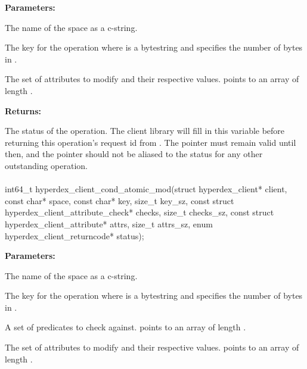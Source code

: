 \noindent\textbf{Parameters:}
\begin{description}[labelindent=\widthof{{\code{attrs}, \code{attrs\_sz}}},leftmargin=*,noitemsep,nolistsep,align=right]
\item[\code{space}] The name of the space as a c-string.
\item[\code{key}, \code{key\_sz}] The key for the operation where  is a bytestring and  specifies the number of bytes in .
\item[\code{attrs}, \code{attrs\_sz}] The set of attributes to modify and their respective values.   points to an array of length .
\end{description}

\noindent\textbf{Returns:}
\begin{description}[labelindent=\widthof{{\code{status}}},leftmargin=*,noitemsep,nolistsep,align=right]
\item[\code{status}] The status of the operation.  The client library will fill in this variable before returning this operation's request id from .  The pointer must remain valid until then, and the pointer should not be aliased to the status for any other outstanding operation.
\end{description}

\paragraph{}
\label{api:c:cond_atomic_mod}
\begin{ccode}
int64_t hyperdex_client_cond_atomic_mod(struct hyperdex_client* client,
        const char* space,
        const char* key, size_t key_sz,
        const struct hyperdex_client_attribute_check* checks, size_t checks_sz,
        const struct hyperdex_client_attribute* attrs, size_t attrs_sz,
        enum hyperdex_client_returncode* status);
\end{ccode}
\funcdesc 

\noindent\textbf{Parameters:}
\begin{description}[labelindent=\widthof{{\code{checks}, \code{checks\_sz}}},leftmargin=*,noitemsep,nolistsep,align=right]
\item[\code{space}] The name of the space as a c-string.
\item[\code{key}, \code{key\_sz}] The key for the operation where  is a bytestring and  specifies the number of bytes in .
\item[\code{checks}, \code{checks\_sz}] A set of predicates to check against.   points to an array of length .
\item[\code{attrs}, \code{attrs\_sz}] The set of attributes to modify and their respective values.   points to an array of length .
\end{description}

